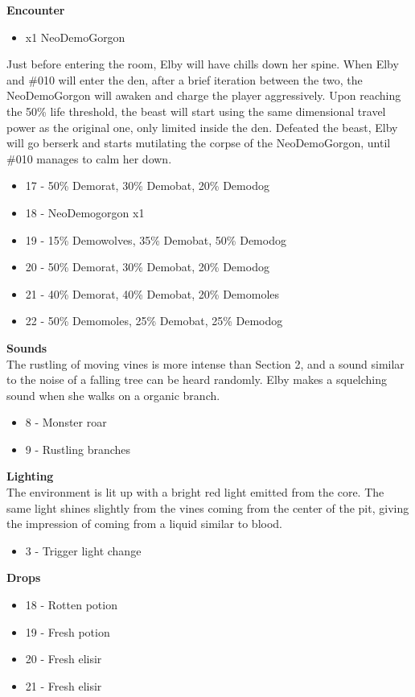 \textbf{Encounter}
\begin{itemize}
	\item x1 NeoDemoGorgon
\end{itemize}
Just before entering the room, Elby will have chills down her spine. When Elby and \#010 will enter the den, after a brief iteration between the two, the NeoDemoGorgon will awaken and charge the player aggressively. Upon reaching the 50\% life threshold, the beast will start using the same dimensional travel power as the original one, only limited inside the den. Defeated the beast, Elby will go berserk and starts mutilating the corpse of the NeoDemoGorgon, until \#010 manages to calm her down.

\begin{itemize}
	\item 17 - 50\% Demorat, 30\% Demobat, 20\% Demodog
	\item 18 - NeoDemogorgon x1
	\item 19 - 15\% Demowolves, 35\% Demobat, 50\% Demodog
	\item 20 - 50\% Demorat, 30\% Demobat, 20\% Demodog
	\item 21 - 40\% Demorat, 40\% Demobat, 20\% Demomoles
	\item 22 - 50\% Demomoles, 25\% Demobat, 25\% Demodog
\end{itemize}

\textbf{Sounds}\\
The rustling of moving vines is more intense than Section 2, and a sound similar to the noise of a falling tree can be heard randomly. Elby makes a squelching sound when she walks on a organic branch.

\begin{itemize}
	\item 8 - Monster roar
	\item 9 - Rustling branches
\end{itemize}

\textbf{Lighting}\\
The environment is lit up with a bright red light emitted from the core. The same light shines slightly from the vines coming from the center of the pit, giving the impression of coming from a liquid similar to blood.

\begin{itemize}
	\item 3 - Trigger light change
\end{itemize}

\textbf{Drops}
\begin{itemize}
	\item 18 - Rotten potion
	\item 19 - Fresh potion
	\item 20 - Fresh elisir
	\item 21 - Fresh elisir
\end{itemize}
\newpage


